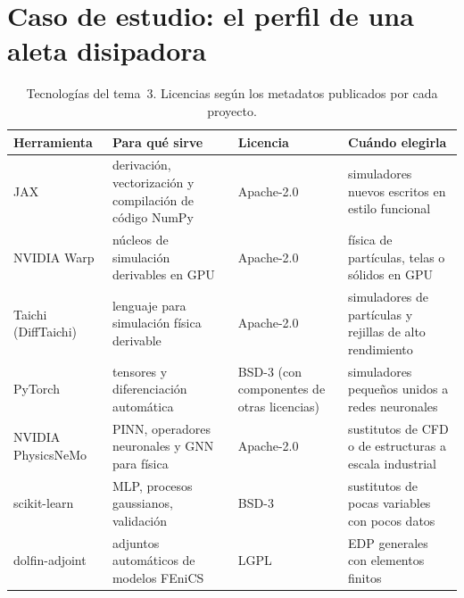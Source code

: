 \section{Caso de estudio: el perfil de una aleta disipadora}

\addtocounter{definicion}{1}%

\begin{table}[h]
\centering\small
\begin{tabularx}{\textwidth}{@{}l>{\raggedright\arraybackslash}X>{\raggedright\arraybackslash}p{2.3cm}>{\raggedright\arraybackslash}X@{}}
\toprule
Herramienta & Para qué sirve & Licencia & Cuándo elegirla \\
\midrule
JAX & derivación, vectorización y compilación de código NumPy & Apache-2.0 & simuladores nuevos escritos en estilo funcional \\
NVIDIA Warp & núcleos de simulación derivables en GPU & Apache-2.0 & física de partículas, telas o sólidos en GPU \\
Taichi (DiffTaichi) & lenguaje para simulación física derivable & Apache-2.0 & simuladores de partículas y rejillas de alto rendimiento \\
PyTorch & tensores y diferenciación automática & BSD-3 (con componentes de otras licencias) & simuladores pequeños unidos a redes neuronales \\
NVIDIA PhysicsNeMo & PINN, operadores neuronales y GNN para física & Apache-2.0 & sustitutos de CFD o de estructuras a escala industrial \\
scikit-learn & MLP, procesos gaussianos, validación & BSD-3 & sustitutos de pocas variables con pocos datos \\
dolfin-adjoint & adjuntos automáticos de modelos FEniCS & LGPL & EDP generales con elementos finitos \\
\bottomrule
\end{tabularx}
\caption{Tecnologías del tema~3. Licencias según los metadatos publicados por cada proyecto.}
\label{tab:tec3}
\end{table}

\addtocounter{definicion}{1}%

